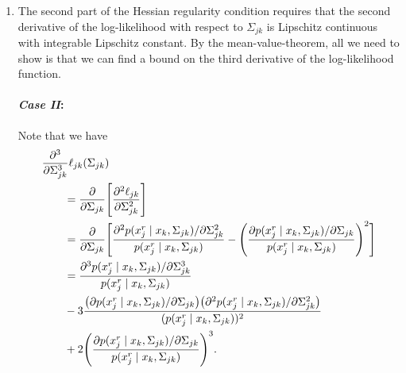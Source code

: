 \begin{condition}
\begin{enumerate}
        \item The second part of the Hessian regularity condition requires that the second derivative of the log-likelihood with respect to $\Sigma_{jk}$ is Lipschitz continuous with integrable Lipschitz constant. By the mean-value-theorem, all we need to show is that we can find a bound on the third derivative of the log-likelihood function.

              \paragraph{\textit{Case II}:} Note that we have
              \begin{align*}
                  \MoveEqLeft \frac{\partial^3}{\partial\Sigma_{jk}^3}\ell_{jk}(\Sigma_{jk})                                                                                                                                                                                                                           \\
                   & = \frac{\partial}{\partial\Sigma_{jk}}\Bigg[\frac{\partial^2\ell_{jk}}{\partial \Sigma_{jk}^{2}}\Bigg]                                                                                                                                                                                            \\
                   & = \frac{\partial}{\partial\Sigma_{jk}}\Bigg[\frac{\partial^2 p(x_j^{r} \mid x_{k}, \Sigma_{jk})/\partial \Sigma_{jk}^{2}}{p(x_j^{r} \mid x_{k}, \Sigma_{jk})} - \Bigg(\frac{\partial p(x_j^{r} \mid x_{k}, \Sigma_{jk}) / \partial \Sigma_{jk}}{p(x_j^{r} \mid x_{k}, \Sigma_{jk})}\Bigg)^2\Bigg] \\
                   & = \frac{\partial^3 p(x_j^{r} \mid x_{k}, \Sigma_{jk}) / \partial \Sigma_{jk}^3}{p(x_j^{r} \mid x_{k}, \Sigma_{jk})}                                                                                                                                                                               \\
                   & - 3\frac{\big(\partial p(x_j^{r} \mid x_{k}, \Sigma_{jk}) / \partial \Sigma_{jk}\big)\big( \partial^2 p(x_j^{r} \mid x_{k}, \Sigma_{jk}) / \partial \Sigma_{jk}^2\big)}{(p(x_j^{r} \mid x_{k}, \Sigma_{jk}))^2}                                                                                   \\
                   & +  2\Bigg(\frac{\partial p(x_j^{r} \mid x_{k}, \Sigma_{jk}) / \partial \Sigma_{jk}}{p(x_j^{r} \mid x_{k}, \Sigma_{jk})}\Bigg)^3.

\end{align*}
\end{enumerate}
\end{condition}
